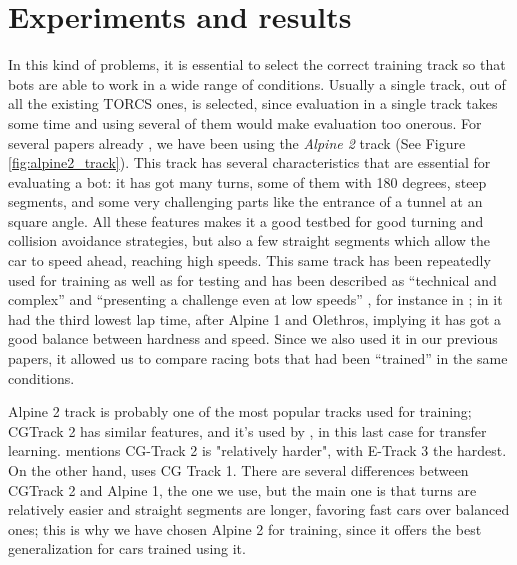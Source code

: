 \documentclass[10pt,journal,compsoc]{IEEEtran}
\begin{document}

\section{Experiments and results}  
\label{sec:results}


In this kind of problems, it is essential to select the correct
training track so that bots are able to work in a wide range of
conditions. Usually a single track, out of all the existing TORCS
ones, is selected, since evaluation in a single track takes some time
and using several of them would make evaluation too onerous. For
several papers already \cite{salem_cig2018,DBLP:conf/cig/SalemMG19},
we have been using the \textit{Alpine 2} track (See Figure
\ref{fig:alpine2_track}). This track has several characteristics that
are essential for evaluating a bot: it has got many turns, some of
them with 180 degrees, steep segments, and some very challenging parts
like the entrance of a tunnel at an square angle. All these features makes
it a good testbed for good turning and collision avoidance
strategies, but also a few straight segments which allow the car to
speed ahead, reaching high speeds. This same track has been repeatedly
used for training as well as for testing and has been described as
``technical and complex'' \cite{AG} and ``presenting a challenge even
at low speeds'' \cite{vrajitoru2018global}, for instance in
\cite{cardamone2010applying,CarRacing_Pelta09,zong2017obstacle}; in \cite{AG} it had the third lowest lap time, after Alpine 1 and Olethros, implying it
has got a good balance between hardness and speed. Since we also used
it in our previous papers, it allowed us to compare racing bots that
had been ``trained'' in the same conditions.

Alpine 2 track is probably one of the most popular tracks used for
training; CGTrack 2 has similar features, and it's used by
\cite{mirus2019short,8833873,verma2018programmatically},
in this last case for transfer learning. \cite{Kole-ParamCarTunning12}
mentions CG-Track 2 is "relatively harder", with E-Track 3 the
hardest. On the other hand, \cite{10.1371/journal.pone.0213193} uses
CG Track 1. There are several differences between CGTrack 2 and Alpine
1, the one we use, but the main one is that turns are relatively
easier and straight segments are longer, favoring fast cars over
balanced ones; this is why we have chosen Alpine 2 for training, since
it offers the best generalization for cars trained using it.
\end{document}
